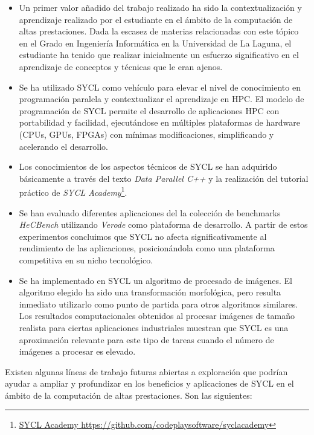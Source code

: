 \begin{itemize}
    \item Un primer valor añadido del trabajo realizado ha sido la contextualización y aprendizaje realizado por el estudiante en el ámbito de la computación de altas prestaciones. Dada la escasez de materias relacionadas con este tópico en el Grado en Ingeniería Informática en la Universidad de La Laguna, el estudiante ha tenido que realizar inicialmente un esfuerzo significativo en el aprendizaje de conceptos y técnicas que le eran ajenos.
    
    \item Se ha utilizado SYCL como vehículo para elevar el nivel de conocimiento en programación paralela y contextualizar el aprendizaje en HPC. El modelo de programación de SYCL permite el desarrollo de aplicaciones HPC con portabilidad y facilidad, ejecutándose en múltiples plataformas de hardware (CPUs, GPUs, FPGAs) con mínimas modificaciones, simplificando y acelerando el desarrollo.
    
    \item Los conocimientos de los aspectos técnicos de SYCL se han adquirido básicamente a través del texto \textit{Data Parallel C++} \cite{Reinders:2023:Data} y la realización del tutorial práctico de \textit{SYCL Academy}\footnote{\href{https://github.com/codeplaysoftware/syclacademy}{{SYCL Academy} \url{https://github.com/codeplaysoftware/syclacademy}}}.
    
    \item Se han evaluado diferentes aplicaciones del la colección de benchmarks \textit{HeCBench} utilizando \textit{Verode} como plataforma de desarrollo. A partir de estos experimentos concluimos que SYCL no afecta significativamente al rendimiento de las aplicaciones, posicionándola como una plataforma competitiva en su nicho tecnológico.
    
    \item Se ha implementado en SYCL un algoritmo de procesado de imágenes. El algoritmo elegido ha sido una transformación morfológica, pero resulta inmediato utilizarlo como punto de partida para otros algoritmos similares.
    Los resultados computacionales obtenidos al procesar imágenes de tamaño realista para ciertas aplicaciones industriales muestran que SYCL es una aproximación relevante para este tipo de tareas cuando el número de imágenes a procesar es elevado.
    
\end{itemize}

Existen algunas líneas de trabajo futuras abiertas a exploración que podrían ayudar a ampliar y profundizar en los beneficios y aplicaciones de SYCL en el ámbito de la computación de altas prestaciones.
Son las siguientes:

